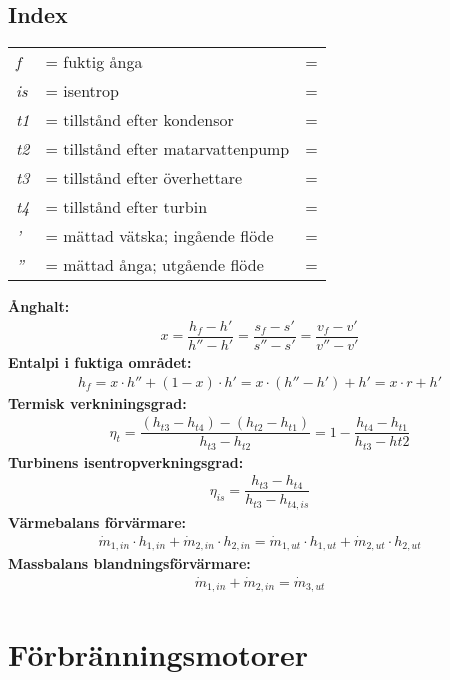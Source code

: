 \subsection*{Index}
	\begin{tabularx}{\linewidth} { l
	>{\raggedright\arraybackslash\hsize=1.5\hsize\linewidth=\hsize}X
	>{\raggedright\arraybackslash\hsize=0.5\hsize\linewidth=\hsize}X}
	\textit{f} & fuktig ånga\\ 
	\textit{is} & isentrop\\ 
	\textit{t1} & tillstånd efter kondensor\\ 
	\textit{t2} & tillstånd efter matarvattenpump\\ 
	\textit{t3} & tillstånd efter överhettare\\ 
	\textit{t4} & tillstånd efter turbin\\ 
	\textit{'} & mättad vätska; ingående flöde\\ 
	\textit{''} & mättad ånga; utgående flöde\\ 
	\end{tabularx}
	\textbf{Ånghalt:}
	\begin{align*}
		x = \dfrac{h_f-h'}{h''-h'} = \dfrac{s_f-s'}{s''-s'} = \dfrac{v_f-v'}{v''-v'}
	\end{align*}
	\textbf{Entalpi i fuktiga området:}
	\begin{align*}
		h_f = x \cdot h'' + (1  - x)  \cdot h' = x \cdot (h'' - h') + h' = x \cdot r + h' 
	\end{align*}
	\textbf{Termisk verkniningsgrad:}
	\begin{align*}
		\eta_t=\dfrac{(h_{t3}-h_{t4})-(h_{t2}-h_{t1})}{h_{t3}-h_{t2}}=1-\dfrac{h_{t4}-h_{t1}}{h_{t3}-h{t2}}
	\end{align*}
	\textbf{Turbinens isentropverkningsgrad:}
	\begin{align*}
		\eta_{is}=\dfrac{h_{t3}-h_{t4}}{h_{t3}-h_{t4,is}}
	\end{align*}
	\textbf{Värmebalans förvärmare:}
	\begin{align*}
		\dot{m}_{1,in}\cdot h_{1,in}+\dot{m}_{2,in}\cdot h_{2,in} = \dot{m}_{1,ut}\cdot h_{1,ut}+\dot{m}_{2,ut}\cdot h_{2,ut}
	\end{align*}
	\textbf{Massbalans blandningsförvärmare:}
	\begin{align*}
		\dot{m}_{1,in}+\dot{m}_{2,in} = \dot{m}_{3,ut}
	\end{align*}
\section*{Förbränningsmotorer}
